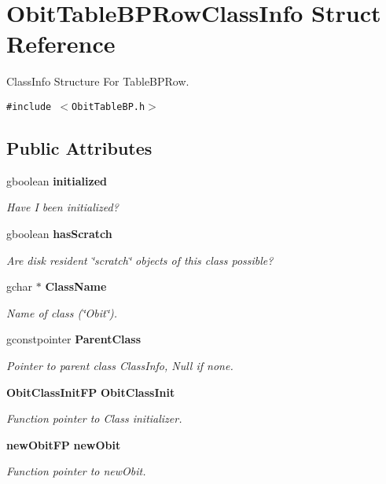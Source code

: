 \section{Obit\-Table\-BPRow\-Class\-Info Struct Reference}
\label{structObitTableBPRowClassInfo}
Class\-Info Structure For Table\-BPRow.  


{\tt \#include $<$Obit\-Table\-BP.h$>$}

\subsection*{Public Attributes}
\begin{CompactItemize}
\item 
gboolean {\bf initialized}
\begin{CompactList}\small\item\em Have I been initialized? \item\end{CompactList}\item 
gboolean {\bf has\-Scratch}
\begin{CompactList}\small\item\em Are disk resident \char`\"{}scratch\char`\"{} objects of this class possible? \item\end{CompactList}\item 
gchar $\ast$ {\bf Class\-Name}
\begin{CompactList}\small\item\em Name of class (\char`\"{}Obit\char`\"{}). \item\end{CompactList}\item 
gconstpointer {\bf Parent\-Class}
\begin{CompactList}\small\item\em Pointer to parent class Class\-Info, Null if none. \item\end{CompactList}\item 
{\bf Obit\-Class\-Init\-FP} {\bf Obit\-Class\-Init}
\begin{CompactList}\small\item\em Function pointer to Class initializer. \item\end{CompactList}\item 
{\bf new\-Obit\-FP} {\bf new\-Obit}
\begin{CompactList}\small\item\em Function pointer to new\-Obit. \item\end{CompactList}\item 

\end{CompactItemize}
